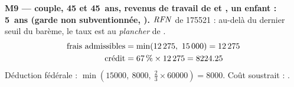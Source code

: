 \medskip\noindent\textbf{M9 --- couple, 45 et 45~ans, revenus de travail de  et , un enfant : 5~ans (garde non subventionnée, ).}
$\mathit{RFN}$ de \num{175521} : au-delà du dernier seuil du
barème, le taux est au \emph{plancher} de .
\begin{align*}
\text{frais admissibles} &= \min(\num{12275},\ \num{15000}) = \num{12275} \\
\text{crédit} &= \num{67}\,\% \times \num{12275} = \num{8224.25}
\end{align*}
Déduction fédérale : $\min(\num{15000},\ \num{8000},\
\tfrac{2}{3} \times \num{60000}) = \num{8000}$. Coût soustrait : .
